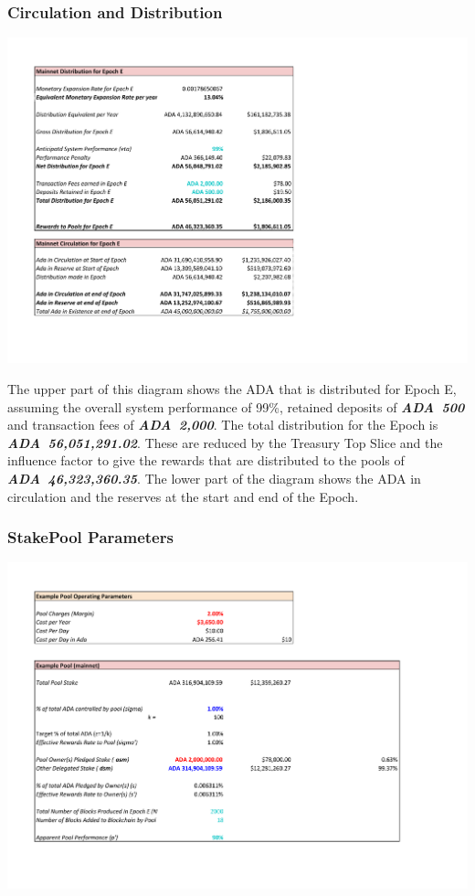 \documentclass[11pt,a4paper,dvipsnames,twosided,final]{article}
\newcommand{\ada}{ADA{}}
\newcommand{\ADA}[1]{\textbf{\emph{\ada~{#1}}}}
\begin{document}
\subsubsection*{Circulation and Distribution}

\hspace{-0.65in}
\includegraphics[width=1.6\textwidth]{RCM2.pdf}

\noindent
The upper part of this diagram shows the \ada{} that is distributed for Epoch E, assuming the overall system performance of 99\%,
retained deposits of \ADA{500} and transaction fees of \ADA{2,000}.  The total distribution for the
Epoch is \ADA{56,051,291.02}.  These are reduced by the Treasury Top Slice and the influence factor
to give the rewards that are distributed to the pools of \ADA{46,323,360.35}.
%
The lower part of the diagram shows the \ada{} in circulation and the reserves at the start and end of the Epoch.

\subsubsection*{StakePool Parameters}

\hspace{-0.65in}
\includegraphics[width=1.25\textwidth]{RCM3.pdf}
\end{document}

